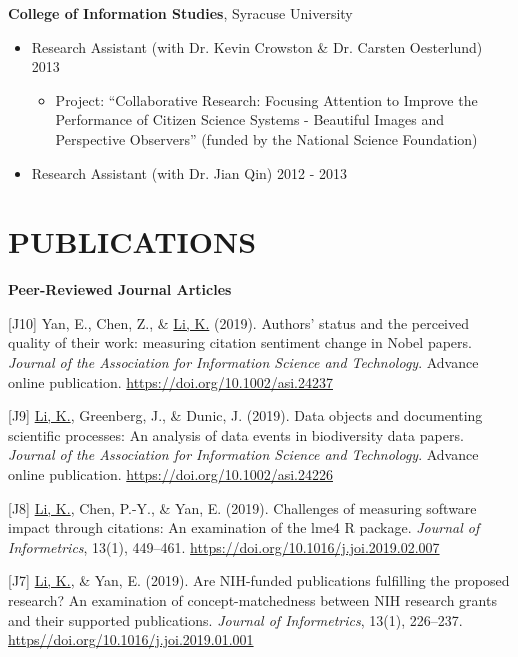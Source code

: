 \documentclass[margin, 10pt]{res} %
\begin{document}
\begin{resume}
\textbf{College of Information Studies}, Syracuse University\\
\begin{itemize}
	\item Research Assistant (with Dr. Kevin Crowston \& Dr. Carsten Oesterlund) \hfill 2013
    \begin{itemize}
     	\item Project: “Collaborative Research: Focusing Attention to Improve the Performance of Citizen Science Systems - Beautiful Images and Perspective Observers” (funded by the National Science Foundation)
    \end{itemize}
    \item Research Assistant (with Dr. Jian Qin) \hfill 2012 - 2013
\end{itemize}

\section{PUBLICATIONS}

\textbf{Peer-Reviewed Journal Articles}

[J10] Yan, E., Chen, Z., \& \underline{Li, K.} (2019). Authors’ status and the perceived quality of their work: measuring citation sentiment change in Nobel papers. \textit{Journal of the Association for Information Science and Technology}. Advance online publication. \href{https://doi.org/10.1002/asi.24237}{https://doi.org/10.1002/asi.24237}

[J9] \underline{Li, K.}, Greenberg, J., \& Dunic, J. (2019). Data objects and documenting scientific processes: An analysis of data events in biodiversity data papers. \textit{Journal of the Association for Information Science and Technology}. Advance online publication. \href{https://doi.org/10.1002/asi.24226}{https://doi.org/10.1002/asi.24226}

[J8] \underline{Li, K.}, Chen, P.-Y., \& Yan, E. (2019). Challenges of measuring software impact through citations: An examination of the lme4 R package. \textit{Journal of Informetrics}, 13(1), 449–461. \href{https://doi.org/10.1016/j.joi.2019.02.007}{https://doi.org/10.1016/j.joi.2019.02.007}

[J7] \underline{Li, K.}, \& Yan, E. (2019). Are NIH-funded publications fulfilling the proposed research? An examination of concept-matchedness between NIH research grants and their supported publications. \textit{Journal of Informetrics}, 13(1), 226–237. \href{https//doi.org/10.1016/j.joi.2019.01.001}{https//doi.org/10.1016/j.joi.2019.01.001}


\end{resume}
\end{document}
